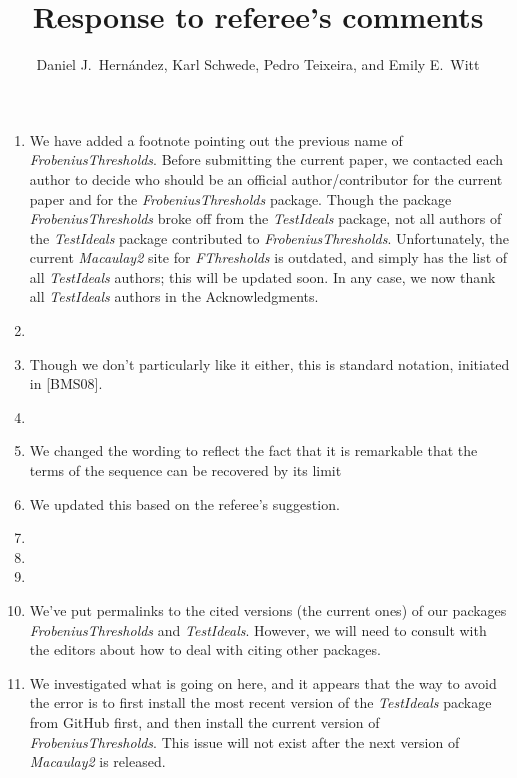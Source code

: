 \documentclass{amsart}
\begin{document}
\title{Response to referee's comments}
\author{Daniel J.\ Hern\'andez,  Karl Schwede, Pedro Teixeira, and Emily E.\ Witt}
\maketitle

\begin{enumerate}
\item We have added a footnote pointing out the previous name of \emph{FrobeniusThresholds}.  Before submitting the current paper, we contacted each author to decide who should be an official author/contributor for the current paper and for the \emph{FrobeniusThresholds} package.
Though the package \emph{FrobeniusThresholds} broke off from the \emph{TestIdeals} package, not all authors of the \emph{TestIdeals} package contributed to \emph{FrobeniusThresholds}.
Unfortunately, the current \emph{Macaulay2} site for \emph{FThresholds} is outdated, and simply has the list of all \emph{TestIdeals} authors; this will be updated soon. 
In any case, we now thank all \emph{TestIdeals} authors in the Acknowledgments. 
\item 
\item Though we don't particularly like it either, this is standard notation, initiated in [BMS08].
\item 
\item We changed the wording to reflect the fact that it is remarkable that the terms of the sequence can be recovered by its limit 
\item We updated this based on the referee's suggestion. 
\item
\item
\item
\item We've put permalinks to the cited versions (the current ones) of our packages  \emph{FrobeniusThresholds} and \emph{TestIdeals}. 
However, we will need to consult with the editors about how to deal with citing other packages.  
\item We investigated what is going on here, and it appears that the way to avoid the error is to first install the most recent version of the \emph{TestIdeals} package from GitHub first, and then install the current version of \emph{FrobeniusThresholds}. 
This issue will not exist after the next version of \emph{Macaulay2} is released.

\end{enumerate}
\end{document}
